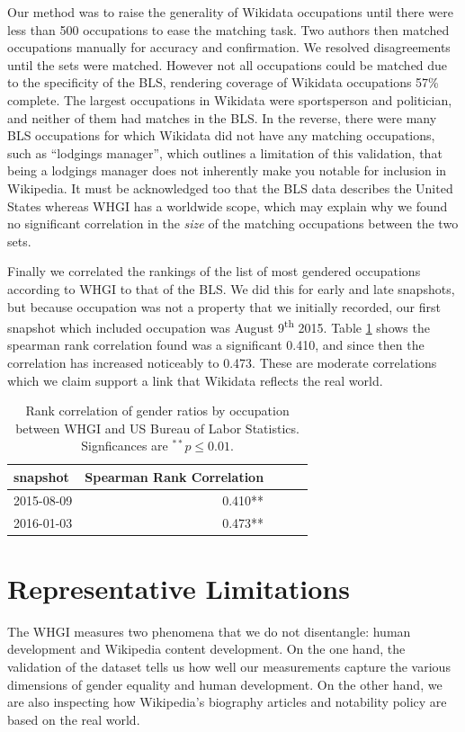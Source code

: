 \documentclass[letterpaper]{article}
\begin{document}
Our method was to raise the generality of Wikidata occupations until there were less than 500 occupations to ease the matching task. Two authors then matched occupations manually for accuracy and confirmation. We resolved disagreements until the sets were matched. However not all occupations could be matched due to the specificity of the BLS, rendering coverage of Wikidata occupations 57\% complete. The largest occupations in Wikidata were sportsperson and politician, and neither of them had matches in the BLS. In the reverse, there were many BLS occupations for which Wikidata did not have any matching occupations, such as ``lodgings manager'', which outlines a limitation of this validation, that being a lodgings manager does not inherently make you notable for inclusion in Wikipedia. It must be acknowledged too that the BLS data describes the United States whereas WHGI has a worldwide scope, which may explain why we found no significant correlation in the \textit{size} of the matching occupations between the two sets.

Finally we correlated the rankings of the list of most gendered occupations according to WHGI to that of the BLS. We did this for early and late snapshots, but because occupation was not a property that we initially recorded, our first snapshot which included occupation was August 9\textsuperscript{th} 2015.  Table \ref{table:bls} shows the spearman rank correlation found was a significant 0.410, and since then the correlation has increased noticeably to 0.473. These are moderate correlations which we claim support a link that Wikidata reflects the real world.

\begin{table}
\caption{Rank correlation of gender ratios by occupation between WHGI and US
Bureau of Labor Statistics. Signficances are $ ^{**}p\leq 0.01$.}
\begin{tabular}{lrrrr}
\toprule
snapshot &  Spearman Rank Correlation \\
\midrule
2015-08-09 & 0.410**  \\
2016-01-03 & 0.473**  \\
\bottomrule
\end{tabular}
\label{table:bls}
\end{table}

\section{Representative Limitations}
The WHGI measures two phenomena that we do not disentangle: human development and Wikipedia content development. On the one hand, the validation of the dataset tells us how well our measurements capture the various dimensions of gender equality and human development. On the other hand, we are also inspecting how Wikipedia's biography articles and notability policy are based on the real world.
\end{document}
